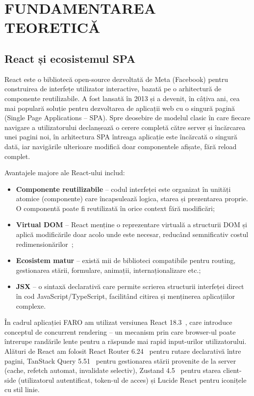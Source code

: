 \documentclass[12pt,a4paper,oneside]{report}
\begin{document}
\chapter{FUNDAMENTAREA TEORETICĂ}

\section{React și ecosistemul SPA}

React este o bibliotecă open-source dezvoltată de Meta (Facebook) pentru construirea de interfețe utilizator interactive, bazată pe o arhitectură de componente reutilizabile. A fost lansată în 2013 și a devenit, în câțiva ani, cea mai populară soluție pentru dezvoltarea de aplicații web cu o singură pagină (Single Page Applications -- SPA). Spre deosebire de modelul clasic în care fiecare navigare a utilizatorului declanșează o cerere completă către server și încărcarea unei pagini noi, în arhitectura SPA întreaga aplicație este încărcată o singură dată, iar navigările ulterioare modifică doar componentele afișate, fără reload complet. \cite{ref:react}

Avantajele majore ale React-ului includ:

\begin{itemize}[leftmargin=2cm,itemsep=2pt]
  \item \textbf{Componente reutilizabile} -- codul interfeței este organizat în unități atomice (componente) care încapsulează logica, starea și prezentarea proprie. O componentă poate fi reutilizată în orice context fără modificări;
  \item \textbf{Virtual DOM} -- React menține o reprezentare virtuală a structurii DOM și aplică modificările doar acolo unde este necesar, reducând semnificativ costul redimensionărilor~\cite{ref:react};
  \item \textbf{Ecosistem matur} -- există mii de biblioteci compatibile pentru routing, gestionarea stării, formulare, animații, internaționalizare etc.;
  \item \textbf{JSX} -- o sintaxă declarativă care permite scrierea structurii interfeței direct în cod JavaScript/TypeScript, facilitând citirea și menținerea aplicațiilor complexe.
\end{itemize}

În cadrul aplicației FARO am utilizat versiunea React 18.3~\cite{ref:react}, care introduce conceptul de concurrent rendering -- un mecanism prin care browser-ul poate întrerupe randările lente pentru a răspunde mai rapid input-urilor utilizatorului. Alături de React am folosit React Router 6.24~\cite{ref:reactrouter} pentru rutare declarativă între pagini, TanStack Query 5.51~\cite{ref:tanstack} pentru gestionarea stării provenite de la server (cache, refetch automat, invalidate selectiv), Zustand 4.5~\cite{ref:zustand} pentru starea client-side (utilizatorul autentificat, token-ul de acces) și Lucide React pentru iconițele cu stil linie.
\end{document}

